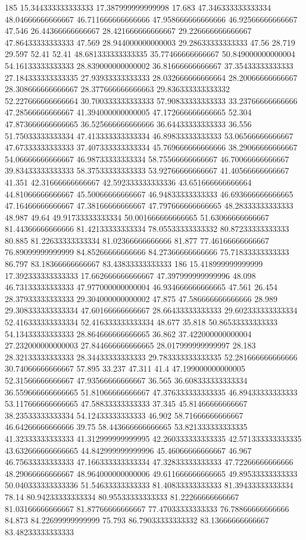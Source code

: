 185 15.344333333333333 17.387999999999998 17.683 47.346333333333334 48.04666666666667 46.711666666666666 47.958666666666666 46.92566666666667 47.546 26.44366666666667 28.421666666666667 29.226666666666667 47.86433333333333 47.569 28.944000000000003 29.28633333333333 47.56 28.719 29.597 52.41 52.41 48.681333333333335 35.77466666666667 50.849000000000004 54.16133333333333 28.839000000000002 36.81666666666667 37.35433333333333 27.184333333333335 27.93933333333333 28.032666666666664 28.20066666666667 28.308666666666667 28.377666666666663 29.836333333333332 52.227666666666664 30.700333333333333 57.90833333333333 33.23766666666666 47.28566666666667 41.394000000000005 47.172666666666665 52.304 47.873666666666665 36.525666666666666 36.64433333333333 36.556 51.75033333333334 47.413333333333334 46.89833333333333 53.06566666666667 47.67333333333333 37.407333333333334 45.769666666666666 38.29066666666667 54.06666666666667 46.98733333333334 58.75566666666667 46.70066666666667 39.83433333333333 58.37533333333333 53.92766666666667 41.40566666666667 41.351 42.31666666666667 42.592333333333336 43.651666666666664 44.81066666666667 45.50066666666667 46.94833333333333 46.693666666666665 47.16466666666667 47.38166666666667 47.797666666666665 48.28333333333333 48.987 49.64 49.91733333333334 50.001666666666665 51.63066666666667 81.44366666666666 81.42133333333334 78.05533333333332 80.87233333333333 80.885 81.22633333333334 81.02366666666666 81.877 77.46166666666667 76.89099999999999 84.85266666666666 84.27366666666666 75.71833333333333 86.797 83.18366666666667 83.43833333333333
186 15.418999999999999 17.392333333333333 17.662666666666667 47.397999999999996 48.098 46.73133333333333 47.977000000000004 46.934666666666665 47.561 26.454 28.37933333333333 29.304000000000002 47.875 47.586666666666666 28.989 29.308333333333334 47.60166666666667 28.66433333333333 29.602333333333334 52.416333333333334 52.416333333333334 48.677 35.818 50.86533333333333 54.13433333333333 28.864666666666665 36.862 37.422000000000004 27.232000000000003 27.844666666666665 28.017999999999997 28.183 28.32133333333333 28.34433333333333 29.783333333333335 52.281666666666666 30.74066666666667 57.895 33.237 47.311 41.4 47.199000000000005 52.31566666666667 47.93566666666667 36.565 36.608333333333334 36.559666666666665 51.81066666666667 47.376333333333335 46.89433333333333 53.117666666666665 47.58833333333333 37.345 45.81466666666667 38.23533333333334 54.12433333333333 46.902 58.71666666666667 46.64266666666666 39.75 58.443666666666665 53.821333333333335 41.32333333333333 41.312999999999995 42.260333333333335 42.571333333333335 43.632666666666665 44.842999999999996 45.46066666666667 46.967 46.75633333333333 47.166333333333334 47.32833333333333 47.72266666666666 48.29066666666667 48.964000000000006 49.611666666666665 49.89533333333333 50.040333333333336 51.54633333333333 81.40833333333333 81.39433333333334 78.14 80.94233333333334 80.95533333333333 81.22266666666667 81.03166666666667 81.87766666666667 77.47033333333333 76.78866666666666 84.873 84.22699999999999 75.793 86.79033333333332 83.13666666666667 83.48233333333333
